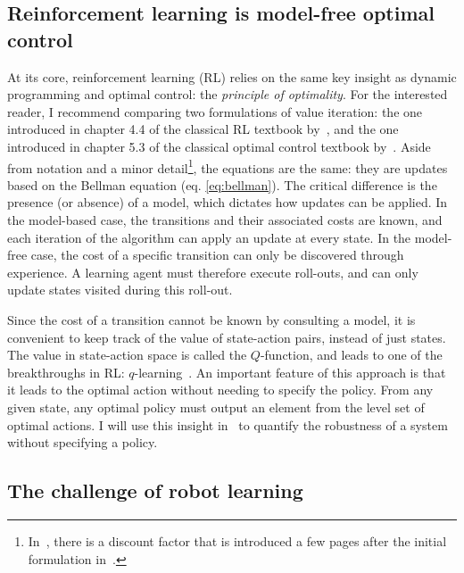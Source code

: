 \subsection{Reinforcement learning is model-free optimal control}
At its core, reinforcement learning (RL) relies on the same key insight as dynamic programming and optimal control: the \emph{principle of optimality}.
For the interested reader, I recommend comparing two formulations of value iteration: the one introduced in chapter 4.4 of the classical RL textbook by~\textcite{sutton2018book}, and the one introduced in chapter 5.3 of the classical optimal control textbook by~\textcite{bertsekas2017book}. Aside from notation and a minor detail\footnote{In~\cite{sutton2018book}, there is a discount factor that is introduced a few pages after the initial formulation in~\cite{bertsekas2017book}.}, the equations are the same: they are updates based on the Bellman equation (eq. \ref{eq:bellman}). The critical difference is the presence (or absence) of a model, which dictates how updates can be applied.
In the model-based case, the transitions and their associated costs are known, and each iteration of the algorithm can apply an update at every state. In the model-free case, the cost of a specific transition can only be discovered through experience. A learning agent must therefore execute roll-outs, and can only update states visited during this roll-out. \par
Since the cost of a transition cannot be known by consulting a model, it is convenient to keep track of the value of state-action pairs, instead of just states. The value in state-action space is called the $Q$-function, and leads to one of the breakthroughs in RL: $q$-learning~\cite[cf. 6.5]{sutton2018book}. An important feature of this approach is that it leads to the optimal action without needing to specify the policy. From any given state, any optimal policy must output an element from the level set of optimal actions. I will use this insight in~\cite{heim2019beyond} to quantify the robustness of a system without specifying a policy.

\subsection{The challenge of robot learning}

